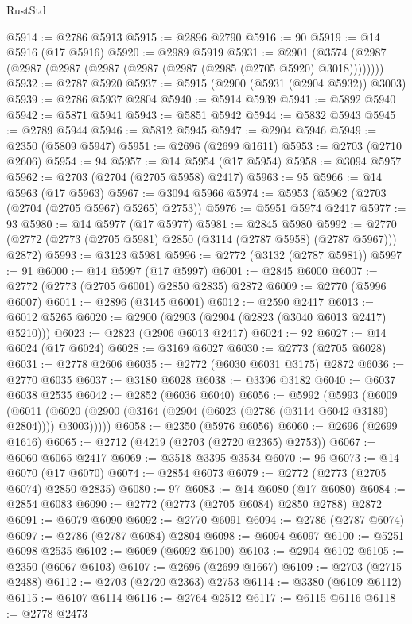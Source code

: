 \begin{lexlean}{RustStd}
\begin{coremodule}
@5914 := @2786 @5913
@5915 := @2896 @2790
@5916 := 90
@5919 := @14 @5916 (@17 @5916)
@5920 := @2989 @5919
@5931 := @2901 (@3574 (@2987 (@2987 (@2987 (@2987 (@2987 (@2987 (@2985 (@2705 @5920) @3018))))))))
@5932 := @2787 @5920
@5937 := @5915 (@2900 (@5931 (@2904 @5932)) @3003)
@5939 := @2786 @5937 @2804
@5940 := @5914 @5939
@5941 := @5892 @5940
@5942 := @5871 @5941
@5943 := @5851 @5942
@5944 := @5832 @5943
@5945 := @2789 @5944
@5946 := @5812 @5945
@5947 := @2904 @5946
@5949 := @2350 (@5809 @5947)
@5951 := @2696 (@2699 @1611)
@5953 := @2703 (@2710 @2606)
@5954 := 94
@5957 := @14 @5954 (@17 @5954)
@5958 := @3094 @5957
@5962 := @2703 (@2704 (@2705 @5958) @2417)
@5963 := 95
@5966 := @14 @5963 (@17 @5963)
@5967 := @3094 @5966
@5974 := @5953 (@5962 (@2703 (@2704 (@2705 @5967) @5265) @2753))
@5976 := @5951 @5974 @2417
@5977 := 93
@5980 := @14 @5977 (@17 @5977)
@5981 := @2845 @5980
@5992 := @2770 (@2772 (@2773 (@2705 @5981) @2850 (@3114 (@2787 @5958) (@2787 @5967))) @2872)
@5993 := @3123 @5981
@5996 := @2772 (@3132 (@2787 @5981))
@5997 := 91
@6000 := @14 @5997 (@17 @5997)
@6001 := @2845 @6000
@6007 := @2772 (@2773 (@2705 @6001) @2850 @2835) @2872
@6009 := @2770 (@5996 @6007)
@6011 := @2896 (@3145 @6001)
@6012 := @2590 @2417
@6013 := @6012 @5265
@6020 := @2900 (@2903 (@2904 (@2823 (@3040 @6013 @2417) @5210)))
@6023 := @2823 (@2906 @6013 @2417)
@6024 := 92
@6027 := @14 @6024 (@17 @6024)
@6028 := @3169 @6027
@6030 := @2773 (@2705 @6028)
@6031 := @2778 @2606
@6035 := @2772 (@6030 @6031 @3175) @2872
@6036 := @2770 @6035
@6037 := @3180 @6028
@6038 := @3396 @3182
@6040 := @6037 @6038 @2535
@6042 := @2852 (@6036 @6040)
@6056 := @5992
    (@5993
      (@6009
        (@6011 (@6020 (@2900 (@3164 (@2904 (@6023 (@2786 (@3114 @6042 @3189) @2804)))) @3003)))))
@6058 := @2350 (@5976 @6056)
@6060 := @2696 (@2699 @1616)
@6065 := @2712 (@4219 (@2703 (@2720 @2365) @2753))
@6067 := @6060 @6065 @2417
@6069 := @3518 @3395 @3534
@6070 := 96
@6073 := @14 @6070 (@17 @6070)
@6074 := @2854 @6073
@6079 := @2772 (@2773 (@2705 @6074) @2850 @2835)
@6080 := 97
@6083 := @14 @6080 (@17 @6080)
@6084 := @2854 @6083
@6090 := @2772 (@2773 (@2705 @6084) @2850 @2788) @2872
@6091 := @6079 @6090
@6092 := @2770 @6091
@6094 := @2786 (@2787 @6074)
@6097 := @2786 (@2787 @6084) @2804
@6098 := @6094 @6097
@6100 := @5251 @6098 @2535
@6102 := @6069 (@6092 @6100)
@6103 := @2904 @6102
@6105 := @2350 (@6067 @6103)
@6107 := @2696 (@2699 @1667)
@6109 := @2703 (@2715 @2488)
@6112 := @2703 (@2720 @2363) @2753
@6114 := @3380 (@6109 @6112)
@6115 := @6107 @6114
@6116 := @2764 @2512
@6117 := @6115 @6116
@6118 := @2778 @2473

\end{coremodule}
\end{lexlean}
